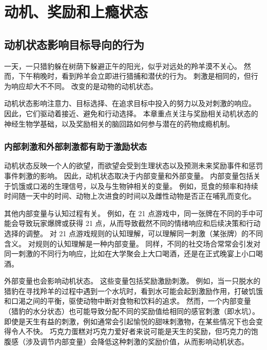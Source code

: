 \chapter{动机、奖励和上瘾状态} \label{chap:chap43}

\section{动机状态影响目标导向的行为}

一天，一只猎豹躲在树荫下躲避正午的阳光，似乎对远处的羚羊漠不关心。
然而，下午稍晚时，看到羚羊会立即进行猎捕和潜伏的行为。
刺激是相同的，但行为响应却大不不同。
改变的是动物的动机状态。



动机状态影响注意力、目标选择、在追求目标中投入的努力以及对刺激的响应。
因此，它们驱动着接近、避免和行动选择。
本章重点关注与奖励相关动机状态的神经生物学基础，以及奖励相关的脑回路如何参与潜在的药物成瘾机制。



\subsection{内部刺激和外部刺激都有助于激励状态}

动机状态反映一个人的欲望，而欲望会受到生理状态以及预测未来奖励事件和惩罚事件刺激的影响。
因此，动机状态取决于内部变量和外部变量。
内部变量包括关于饥饿或口渴的生理信号，以及与生物钟相关的变量。
例如，觅食的频率和持续时间随一天中的时间、动物上次进食的时间以及雌性动物是否正在哺乳而变化。


其他内部变量与认知过程有关。
例如，在 21 点游戏中，同一张牌在不同的手中可能会导致玩家爆牌或获得 21 点，从而导致截然不同的情绪响应和后续决策和行动选择的调整。
对 21 点游戏规则的认知理解，可以理解同一刺激（某张牌）的不同含义。
对规则的认知理解是一种内部变量。
同样，不同的社交场合常常会引发对同一刺激的不同行为响应，比如在大学聚会上大口喝酒，还是在正式晚宴上小口喝酒。


外部变量也会影响动机状态。
这些变量包括奖励激励刺激。
例如，当一只脱水的猎豹在寻找羚羊的过程中遇到一个水坑时，看到水可能会起到激励作用，打破饥饿和口渴之间的平衡，驱使动物中断对食物和饮料的追求。
然而，一个内部变量（猎豹的水分状态）也可能导致分配不同的奖励值给相同的感官刺激（即水坑）。
即使是天生有益的刺激，例如通常会引起愉悦的甜味刺激物，在某些情况下也会变得令人不快。
巧克力蛋糕对巧克力爱好者来说可能是天生的奖励，但巧克力的饱腹感（涉及调节内部变量）会降低这种刺激的奖励价值，从而影响动机状态。



